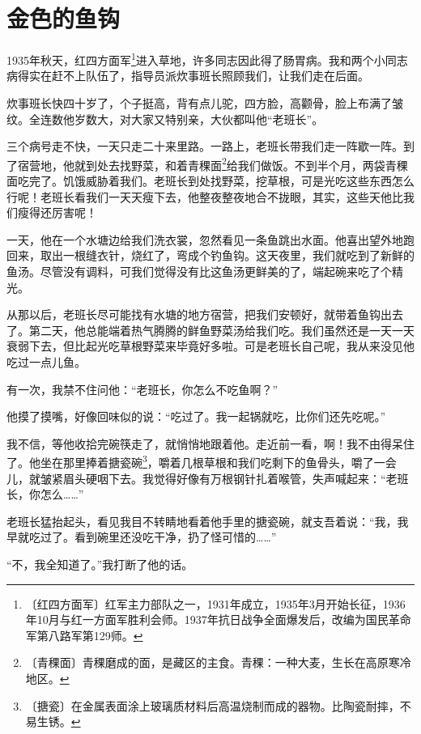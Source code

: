 \documentclass[12pt,UTF-8,openany]{ctexbook}
\begin{document}
\chapter{金色的鱼钩}

\begin{Large}
    
    1935年秋天，红四方面军\footnote{〔红四方面军〕红军主力部队之一，1931年成立，1935年3月开始长征，1936年10月与红一方面军胜利会师。1937年抗日战争全面爆发后，改编为国民革命军第八路军第129师。}进入草地，许多同志因此得了肠胃病。我和两个小同志病得实在赶不上队伍了，指导员派炊事班长照顾我们，让我们走在后面。
    
    炊事班长快四十岁了，个子挺高，背有点儿驼，四方脸，高颧骨，脸上布满了皱纹。全连数他岁数大，对大家又特别亲，大伙都叫他“老班长”。
    
    三个病号走不快，一天只走二十来里路。一路上，老班长带我们走一阵歇一阵。到了宿营地，他就到处去找野菜，和着青稞面\footnote{〔青稞面〕青稞磨成的面，是藏区的主食。青稞：一种大麦，生长在高原寒冷地区。}给我们做饭。不到半个月，两袋青稞面吃完了。饥饿威胁着我们。老班长到处找野菜，挖草根，可是光吃这些东西怎么行呢！老班长看我们一天天瘦下去，他整夜整夜地合不拢眼，其实，这些天他比我们瘦得还厉害呢！
    
    一天，他在一个水塘边给我们洗衣裳，忽然看见一条鱼跳出水面。他喜出望外地跑回来，取出一根缝衣针，烧红了，弯成个钓鱼钩。这天夜里，我们就吃到了新鲜的鱼汤。尽管没有调料，可我们觉得没有比这鱼汤更鲜美的了，端起碗来吃了个精光。
    
    从那以后，老班长尽可能找有水塘的地方宿营，把我们安顿好，就带着鱼钩出去了。第二天，他总能端着热气腾腾的鲜鱼野菜汤给我们吃。我们虽然还是一天一天衰弱下去，但比起光吃草根野菜来毕竟好多啦。可是老班长自己呢，我从来没见他吃过一点儿鱼。
    
    有一次，我禁不住问他：“老班长，你怎么不吃鱼啊？”
    
    他摸了摸嘴，好像回味似的说：“吃过了。我一起锅就吃，比你们还先吃呢。”
    
    我不信，等他收拾完碗筷走了，就悄悄地跟着他。走近前一看，啊！我不由得呆住了。他坐在那里捧着搪瓷碗\footnote{〔搪瓷〕在金属表面涂上玻璃质材料后高温烧制而成的器物。比陶瓷耐摔，不易生锈。}，嚼着几根草根和我们吃剩下的鱼骨头，嚼了一会儿，就皱紧眉头硬咽下去。我觉得好像有万根钢针扎着喉管，失声喊起来：“老班长，你怎么……”
    
    老班长猛抬起头，看见我目不转睛地看着他手里的搪瓷碗，就支吾着说：“我，我早就吃过了。看到碗里还没吃干净，扔了怪可惜的……”
    
    “不，我全知道了。”我打断了他的话。
    

\end{Large}
\end{document}
